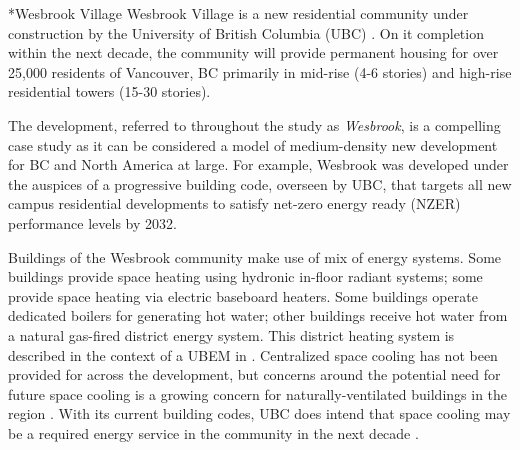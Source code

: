 \documentclass[twocolumn, a4paper,10pt]{article}
\makeatletter
\renewcommand\subsection{\@startsection{subsection}{1}{\z@}{\z@}{\z@}{\normalfont\normalsize\bfseries}}
\renewcommand\subsection{\@startsection{subsection}{1}{\z@}{\z@}{0.1pt}{\normalfont\normalsize\bfseries}}
\makeatother
\begin{document}
\subsection*{Wesbrook Village} 
Wesbrook Village is a new residential community under construction by the University of British Columbia (UBC) \citep{ubc_planning_ubc_2020_SR, ubc_planning_ubc_2020_wb}. On it completion within the next decade, the community will provide permanent housing for over 25,000 residents of Vancouver, BC primarily in mid-rise (4-6 stories) and high-rise residential towers (15-30 stories). 

 The development, referred to throughout the study as \textit{Wesbrook}, is a compelling case study as it can be considered a model of medium-density new development for BC and North America at large. For example, Wesbrook was developed under the auspices of a progressive building code, overseen by UBC, that targets all new campus residential developments to satisfy net-zero energy ready (NZER) performance levels by 2032.

 Buildings of the Wesbrook community make use of mix of energy systems. Some buildings provide space heating using hydronic in-floor radiant systems; some provide space heating via electric baseboard heaters. Some buildings operate dedicated boilers for generating hot water; other buildings receive hot water from a natural gas-fired district energy system.  This district heating system is described in the context of a UBEM in \citet{mccarty_accepted_2020}. Centralized space cooling has not been provided for across the development, but concerns around the potential need for future space cooling is a growing concern for naturally-ventilated buildings in the region \citep{rysanek_forecasting_2021}. With its current building codes, UBC does intend that space cooling may be a required energy service in the community in the next decade \citep{noauthor_residential_2021}.
\end{document}
